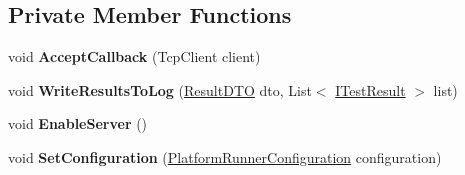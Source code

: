 \subsection*{Private Member Functions}
\begin{DoxyCompactItemize}
\item 
\mbox{\label{class_unity_test_1_1_network_results_receiver_af33843897100190a8dcd4be61d37d785}} 
void {\bfseries Accept\+Callback} (Tcp\+Client client)
\item 
\mbox{\label{class_unity_test_1_1_network_results_receiver_af96db74d8e9419034d9b9fd4cea2d012}} 
void {\bfseries Write\+Results\+To\+Log} (\hyperlink{class_unity_test_1_1_result_d_t_o}{Result\+D\+TO} dto, List$<$ \hyperlink{interface_i_test_result}{I\+Test\+Result} $>$ list)
\item 
\mbox{\label{class_unity_test_1_1_network_results_receiver_a21eabe78fbfbeb6f04810117899a0842}} 
void {\bfseries Enable\+Server} ()
\item 
\mbox{\label{class_unity_test_1_1_network_results_receiver_af0d4fe2edfe72c65e6694cdbc4864d45}} 
void {\bfseries Set\+Configuration} (\hyperlink{class_platform_runner_configuration}{Platform\+Runner\+Configuration} configuration)
\end{DoxyCompactItemize}
